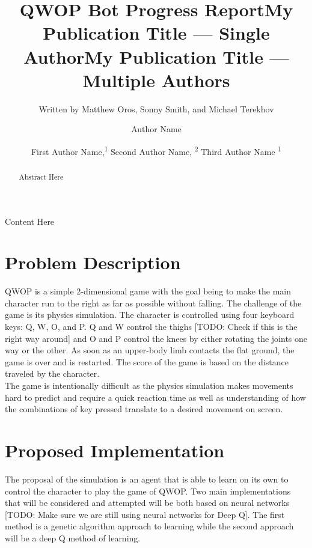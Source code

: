 \documentclass[letterpaper]{article} %
\title{QWOP Bot Progress Report}
\author{
    Written by Matthew Oros, Sonny Smith, and Michael Terekhov \\ 
}
\title{My Publication Title --- Single Author}
\author {
    Author Name \\
}
\title{My Publication Title --- Multiple Authors}
\author {
    First Author Name,\textsuperscript{\rm 1}
    Second Author Name, \textsuperscript{\rm 2}
    Third Author Name \textsuperscript{\rm 1} \\
}
\begin{document}
\maketitle

\begin{abstract}
Abstract Here
\end{abstract}

\noindent Content Here

\section{Problem Description}
QWOP is a simple 2-dimensional game with the goal being to make the main character run to the right as far as possible without falling.
The challenge of the game is its physics simulation.
The character is controlled using four keyboard keys: Q, W, O, and P. Q and W control the thighs [TODO: Check if this is the right way around] and O and P control the knees by either rotating the joints one way or the other.
As soon as an upper-body limb contacts the flat ground, the game is over and is restarted.
The score of the game is based on the distance traveled by the character. \\
\indent The game is intentionally difficult as the physics simulation makes movements hard to predict and require a quick reaction time as well as understanding of how the combinations of key pressed translate to a desired movement on screen.

\section{Proposed Implementation}
The proposal of the simulation is an agent that is able to learn on its own to control the character to play the game of QWOP.
Two main implementations that will be considered and attempted will be both based on neural networks [TODO: Make sure we are still using neural networks for Deep Q].
The first method is a genetic algorithm approach to learning while the second approach will be a deep Q method of learning.
\end{document}
